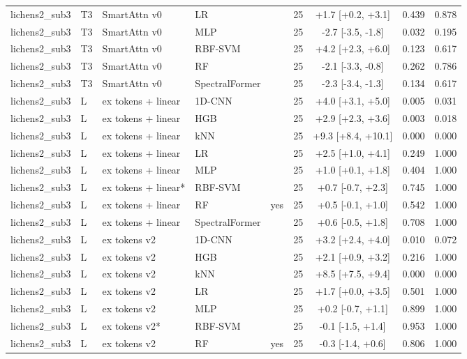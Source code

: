 \begin{tabular}{lllllcccc}
lichens2_sub3 & T3 & SmartAttn v0 & LR &  & 25 & +1.7 [+0.2, +3.1] & 0.439 & 0.878 \\
lichens2_sub3 & T3 & SmartAttn v0 & MLP &  & 25 & -2.7 [-3.5, -1.8] & 0.032 & 0.195 \\
lichens2_sub3 & T3 & SmartAttn v0 & RBF-SVM &  & 25 & +4.2 [+2.3, +6.0] & 0.123 & 0.617 \\
lichens2_sub3 & T3 & SmartAttn v0 & RF &  & 25 & -2.1 [-3.3, -0.8] & 0.262 & 0.786 \\
lichens2_sub3 & T3 & SmartAttn v0 & SpectralFormer &  & 25 & -2.3 [-3.4, -1.3] & 0.134 & 0.617 \\
lichens2_sub3 & L & ex tokens + linear & 1D-CNN &  & 25 & +4.0 [+3.1, +5.0] & 0.005 & 0.031 \\
lichens2_sub3 & L & ex tokens + linear & HGB &  & 25 & +2.9 [+2.3, +3.6] & 0.003 & 0.018 \\
lichens2_sub3 & L & ex tokens + linear & kNN &  & 25 & +9.3 [+8.4, +10.1] & 0.000 & 0.000 \\
lichens2_sub3 & L & ex tokens + linear & LR &  & 25 & +2.5 [+1.0, +4.1] & 0.249 & 1.000 \\
lichens2_sub3 & L & ex tokens + linear & MLP &  & 25 & +1.0 [+0.1, +1.8] & 0.404 & 1.000 \\
lichens2_sub3 & L & ex tokens + linear* & RBF-SVM &  & 25 & +0.7 [-0.7, +2.3] & 0.745 & 1.000 \\
lichens2_sub3 & L & ex tokens + linear & RF & yes & 25 & +0.5 [-0.1, +1.0] & 0.542 & 1.000 \\
lichens2_sub3 & L & ex tokens + linear & SpectralFormer &  & 25 & +0.6 [-0.5, +1.8] & 0.708 & 1.000 \\
lichens2_sub3 & L & ex tokens v2 & 1D-CNN &  & 25 & +3.2 [+2.4, +4.0] & 0.010 & 0.072 \\
lichens2_sub3 & L & ex tokens v2 & HGB &  & 25 & +2.1 [+0.9, +3.2] & 0.216 & 1.000 \\
lichens2_sub3 & L & ex tokens v2 & kNN &  & 25 & +8.5 [+7.5, +9.4] & 0.000 & 0.000 \\
lichens2_sub3 & L & ex tokens v2 & LR &  & 25 & +1.7 [+0.0, +3.5] & 0.501 & 1.000 \\
lichens2_sub3 & L & ex tokens v2 & MLP &  & 25 & +0.2 [-0.7, +1.1] & 0.899 & 1.000 \\
lichens2_sub3 & L & ex tokens v2* & RBF-SVM &  & 25 & -0.1 [-1.5, +1.4] & 0.953 & 1.000 \\
lichens2_sub3 & L & ex tokens v2 & RF & yes & 25 & -0.3 [-1.4, +0.6] & 0.806 & 1.000 \\

\end{tabular}
